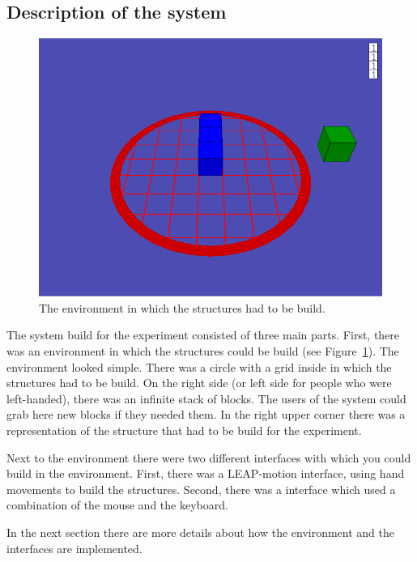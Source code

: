 \subsection{Description of the system}
\begin{figure}
\includegraphics[width=\textwidth]{imgs/environment}
\caption{The environment in which the structures had to be build.}
\label{fig:environment}
\end{figure}

The system build for the experiment consisted of three main parts. First, there was an environment in which the structures could be build (see Figure~\ref{fig:environment}). The environment looked simple. There was a circle with a grid inside in which the structures had to be build. On the right side (or left side for people who were left-handed), there was an infinite stack of blocks. The users of the system could grab here new blocks if they needed them. In the right upper corner there was a representation of the structure that had to be build for the experiment.

Next to the environment there were two different interfaces with which you could build in the environment. First, there was a LEAP-motion interface, using hand movements to build the structures. Second, there was a interface which used a combination of the mouse and the keyboard.

In the next section there are more details about how the environment and the interfaces are implemented.